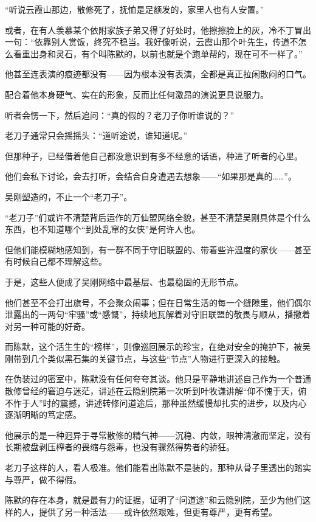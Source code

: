 “听说云霞山那边，散修死了，抚恤是足额发的，家里人也有人安置。”

或者，在有人羡慕某个依附家族子弟又得了好处时，他擦擦脸上的灰，冷不丁冒出一句：“依靠别人赏饭，终究不稳当。我好像听说，云霞山那个叶先生，传道不怎么看重出身和灵石，有个叫陈默的，以前也就是个跑单帮的，现在可不一样了。”

他甚至连表演的痕迹都没有——因为根本没有表演，全都是真正拉闲散闷的口气。

配合着他本身硬气、实在的形象，反而比任何激昂的演说更具说服力。

听者会愣一下，然后追问：“真的假的？老刀子你听谁说的？”

老刀子通常只会摇摇头：“道听途说，谁知道呢。”

但那种子，已经借着他自己都没意识到有多不经意的话语，种进了听者的心里。

他们会私下讨论，会去打听，会结合自身遭遇去想象——“如果那是真的……”。

\vspace{2em}

吴刚塑造的，不止一个“老刀子”。

“老刀子”们或许不清楚背后运作的万仙盟网络全貌，甚至不清楚吴刚具体是个什么东西，也不知道哪个“到处乱窜的女侠”是何许人也。

但他们能模糊地感知到，有一群不同于守旧联盟的、带着些许温度的家伙——甚至有时候自己都不理解这些。

于是，这些人便成了吴刚网络中最基层、也最稳固的无形节点。

他们甚至不会打出旗号，不会聚众闹事；但在日常生活的每一个缝隙里，他们偶尔泄露出的一两句“牢骚”或“感慨”，持续地瓦解着对守旧联盟的敬畏与顺从，播撒着对另一种可能的好奇。

而陈默，这个活生生的“榜样”，则像巡回展示的珍宝，在绝对安全的掩护下，被吴刚带到几个类似黑石集的关键节点，与这些“节点”人物进行更深入的接触。

在伪装过的密室中，陈默没有任何夸夸其谈。他只是平静地讲述自己作为一个普通散修曾经的窘迫与迷茫，讲述在云隐别院第一次听到叶牧谦讲解“仰不愧于天，俯不怍于人”时的震撼，讲述转修问道途后，那种虽然缓慢却扎实的进步，以及内心逐渐明晰的笃定感。

他展示的是一种迥异于寻常散修的精气神——沉稳、内敛，眼神清澈而坚定，没有长期被盘剥压榨者的畏缩与怨毒，也没有骤然得势者的骄狂。

老刀子这样的人，看人极准。他们能看出陈默不是装的，那种从骨子里透出的踏实与尊严，做不得假。

陈默的存在本身，就是最有力的证据，证明了“问道途”和云隐别院，至少为他们这样的人，提供了另一种活法——或许依然艰难，但更有尊严，更有希望。

